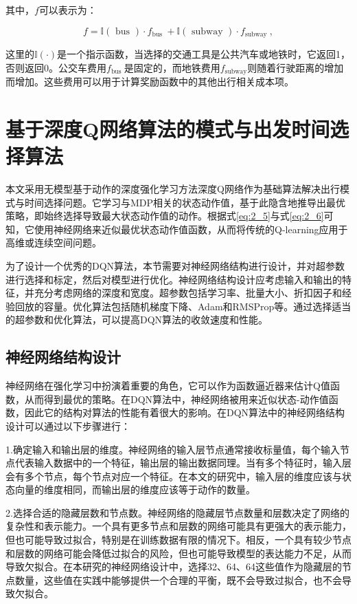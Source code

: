 其中，$f$可以表示为：

\begin{equation}
f=\mathbb{I}(\text { bus }) \cdot f_{\text {bus }}+\mathbb{I}(\text { subway }) \cdot f_{\text {subway }},
\end{equation}

这里的$\mathbb{I}(\cdot)$是一个指示函数，当选择的交通工具是公共汽车或地铁时，它返回1，否则返回0。公交车费用$f_{\text {bus }}$是固定的，而地铁费用$f_{\text {subway} }$则随着行驶距离的增加而增加。这些费用可以用于计算奖励函数中的其他出行相关成本项。

\section{基于深度Q网络算法的模式与出发时间选择算法}
\label{sec:4_2}

本文采用无模型基于动作的深度强化学习方法深度Q网络作为基础算法解决出行模式与时间选择问题。它学习与MDP相关的状态动作值，基于此隐含地推导出最优策略，即始终选择导致最大状态动作值的动作。根据式\ref{eq:2_5}与式\ref{eq:2_6}可知，它使用神经网络来近似最优状态动作值函数，从而将传统的Q-learning应用于高维或连续空间问题。

为了设计一个优秀的DQN算法，本节需要对神经网络结构进行设计，并对超参数进行选择和标定，然后对模型进行优化。神经网络结构设计应考虑输入和输出的特征，并充分考虑网络的深度和宽度。超参数包括学习率、批量大小、折扣因子和经验回放的容量。优化算法包括随机梯度下降、Adam和RMSProp等。通过选择适当的超参数和优化算法，可以提高DQN算法的收敛速度和性能。

\subsection{神经网络结构设计}


神经网络在强化学习中扮演着重要的角色，它可以作为函数逼近器来估计Q值函数，从而得到最优的策略。在DQN算法中，神经网络被用来近似状态-动作值函数，因此它的结构对算法的性能有着很大的影响。在DQN算法中的神经网络结构设计可以通过以下步骤进行：

1.确定输入和输出层的维度。神经网络的输入层节点通常接收标量值，每个输入节点代表输入数据中的一个特征，输出层的输出数据同理。当有多个特征时，输入层会有多个节点，每个节点对应一个特征。在本文的研究中，输入层的维度应该与状态向量的维度相同，而输出层的维度应该等于动作的数量。

2.选择合适的隐藏层数和节点数。神经网络的隐藏层节点数量和层数决定了网络的复杂性和表示能力。一个具有更多节点和层数的网络可能具有更强大的表示能力，但也可能导致过拟合，特别是在训练数据有限的情况下。相反，一个具有较少节点和层数的网络可能会降低过拟合的风险，但也可能导致模型的表达能力不足，从而导致欠拟合。在本研究的神经网络设计中，选择32、64、64这些值作为隐藏层的节点数量，这些值在实践中能够提供一个合理的平衡，既不会导致过拟合，也不会导致欠拟合。

